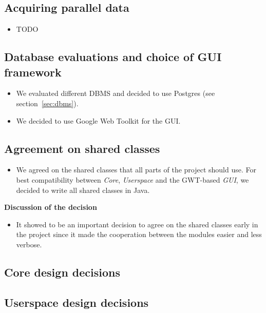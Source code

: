 \subsection{Acquiring parallel data}

\begin{itemize}
	\item TODO
\end{itemize}


\subsection{Database evaluations and choice of GUI framework}

\begin{itemize}
	\item We evaluated different DBMS and decided to use Postgres (see section~\ref{sec:dbms}).
	\item We decided to use Google Web Toolkit for the GUI.

\end{itemize}


\subsection{Agreement on shared classes}

\begin{itemize}
	\item We agreed on the shared classes that all parts of the project should use. For best compatibility between  \emph{Core}, \emph{Userspace} and the GWT-based \emph{GUI}, we decided to write all shared classes in Java.
\end{itemize}


\noindent\textbf{Discussion of the decision}

\begin{itemize}
	\item It showed to be an important decision to agree on the shared classes early in the project since it made the cooperation between the modules easier and less verbose.
\end{itemize}


\subsection{Core design decisions}



\subsection{Userspace design decisions}




